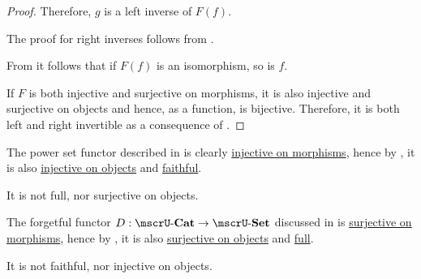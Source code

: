 \begin{proof}
  Therefore, \( g \) is a left inverse of \( F(f) \).

  The proof for right inverses follows from .

  From  it follows that if \( F(f) \) is an isomorphism, so is \( f \).

   If \( F \) is both injective and surjective on morphisms, it is also injective and surjective on objects and hence, as a function, is bijective. Therefore, it is both left and right invertible as a consequence of .
\end{proof}

\begin{example}\label{ex:def:functor_invertibility}
  \hfill
  \begin{thmenum}
     The power set functor described in  is clearly \hyperref[def:functor_invertibility/injective_on_morphisms]{injective on morphisms}, hence by , it is also \hyperref[def:functor_invertibility/injective_on_objects]{injective on objects} and \hyperref[def:functor_invertibility/faithful]{faithful}.

    It is not full, nor surjective on objects.

     The forgetful functor \( D: \ucat{Cat} \to \ucat{Set} \) discussed in  is \hyperref[def:functor_invertibility/surjective_on_morphisms]{surjective on morphisms}, hence by , it is also \hyperref[def:functor_invertibility/surjective_on_objects]{surjective on objects} and \hyperref[def:functor_invertibility/full]{full}.

    It is not faithful, nor injective on objects.
  \end{thmenum}
\end{example}

